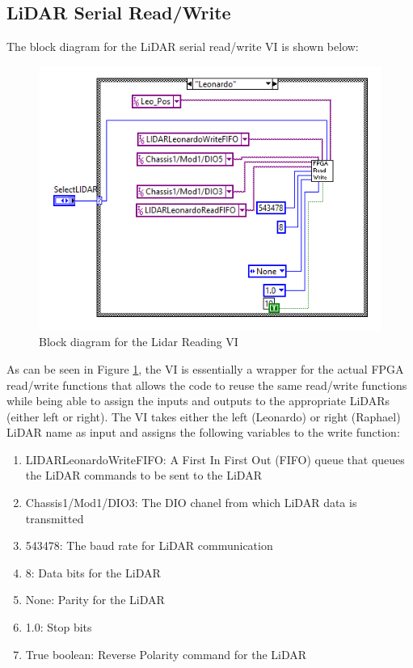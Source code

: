 \subsection{LiDAR Serial Read/Write}

The block diagram for the LiDAR serial read/write VI is shown below:

\begin{figure}[h!]
\centering
\includegraphics[scale=0.75]{Photos/readlidar_block.png}
\caption{Block diagram for the Lidar Reading VI}
\label{fig:readlidar_block}
\end{figure}

\noindent As can be seen in Figure \ref{fig:readlidar_block}, the VI is essentially a wrapper for the actual FPGA read/write functions that allows the code to reuse the same read/write functions while being able to assign the inputs and outputs to the appropriate LiDARs (either left or right). The VI takes either the left (Leonardo) or right (Raphael) LiDAR name as input and assigns the following variables to the write function:

\begin{enumerate}
\item LIDARLeonardoWriteFIFO: A First In First Out (FIFO) queue that queues the LiDAR commands to be sent to the LiDAR 
\item Chassis1/Mod1/DIO3: The DIO chanel from which LiDAR data is transmitted
\item 543478: The baud rate for LiDAR communication
\item 8: Data bits for the LiDAR
\item None: Parity for the LiDAR
\item  1.0: Stop bits
\item True boolean: Reverse Polarity command for the LiDAR
\end{enumerate}

